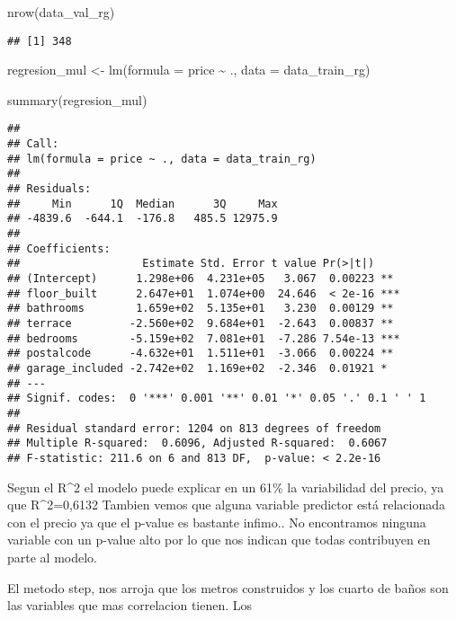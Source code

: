 \documentclass[
]{article}
\newenvironment{Shaded}{\begin{snugshade}}{\end{snugshade}}
\newcommand{\AttributeTok}[1]{\textcolor[rgb]{0.77,0.63,0.00}{#1}}
\newcommand{\FunctionTok}[1]{\textcolor[rgb]{0.00,0.00,0.00}{#1}}
\newcommand{\NormalTok}[1]{#1}
\newcommand{\OtherTok}[1]{\textcolor[rgb]{0.56,0.35,0.01}{#1}}
\newcommand{\SpecialCharTok}[1]{\textcolor[rgb]{0.00,0.00,0.00}{#1}}
\begin{document}
\begin{Shaded}
\begin{Highlighting}[]
\FunctionTok{nrow}\NormalTok{(data\_val\_rg)}
\end{Highlighting}
\end{Shaded}

\begin{verbatim}
## [1] 348
\end{verbatim}

\begin{Shaded}
\begin{Highlighting}[]
\NormalTok{regresion\_mul }\OtherTok{\textless{}{-}} \FunctionTok{lm}\NormalTok{(}\AttributeTok{formula =}\NormalTok{ price }\SpecialCharTok{\textasciitilde{}}\NormalTok{ ., }\AttributeTok{data =}\NormalTok{ data\_train\_rg)}

\FunctionTok{summary}\NormalTok{(regresion\_mul)}
\end{Highlighting}
\end{Shaded}

\begin{verbatim}
## 
## Call:
## lm(formula = price ~ ., data = data_train_rg)
## 
## Residuals:
##     Min      1Q  Median      3Q     Max 
## -4839.6  -644.1  -176.8   485.5 12975.9 
## 
## Coefficients:
##                   Estimate Std. Error t value Pr(>|t|)    
## (Intercept)      1.298e+06  4.231e+05   3.067  0.00223 ** 
## floor_built      2.647e+01  1.074e+00  24.646  < 2e-16 ***
## bathrooms        1.659e+02  5.135e+01   3.230  0.00129 ** 
## terrace         -2.560e+02  9.684e+01  -2.643  0.00837 ** 
## bedrooms        -5.159e+02  7.081e+01  -7.286 7.54e-13 ***
## postalcode      -4.632e+01  1.511e+01  -3.066  0.00224 ** 
## garage_included -2.742e+02  1.169e+02  -2.346  0.01921 *  
## ---
## Signif. codes:  0 '***' 0.001 '**' 0.01 '*' 0.05 '.' 0.1 ' ' 1
## 
## Residual standard error: 1204 on 813 degrees of freedom
## Multiple R-squared:  0.6096, Adjusted R-squared:  0.6067 
## F-statistic: 211.6 on 6 and 813 DF,  p-value: < 2.2e-16
\end{verbatim}

Segun el R\^{}2 el modelo puede explicar en un 61\% la variabilidad del
precio, ya que R\^{}2=0,6132 Tambien vemos que alguna variable predictor
está relacionada con el precio ya que el p-value es bastante infimo.. No
encontramos ninguna variable con un p-value alto por lo que nos indican
que todas contribuyen en parte al modelo.

El metodo step, nos arroja que los metros construidos y los cuarto de
baños son las variables que mas correlacion tienen. Los
\end{document}
